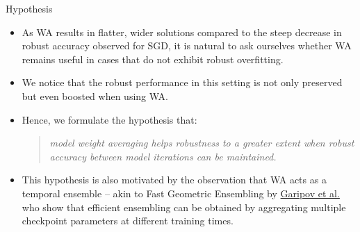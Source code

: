 \begin{frame}{Hypothesis}
    \begin{itemize}[<+-| alert@+>] %
        \item As WA results in flatter, wider solutions compared to the steep decrease in robust accuracy observed for SGD, it is natural to ask ourselves whether WA remains useful in cases that do not exhibit robust overfitting.
        \item We notice that the robust performance in this setting is not only preserved but even boosted when using WA. 
        \item Hence, we formulate the hypothesis that: 
            \begin{quote}
                \emph{model weight averaging helps robustness to a greater extent when robust accuracy between model iterations can be maintained.}
            \end{quote}
        \item This hypothesis is also motivated by the observation that WA acts as a temporal ensemble – akin to Fast Geometric Ensembling by \href{https://arxiv.org/pdf/1802.10026}{Garipov et al.} who show that efficient ensembling can be obtained by aggregating multiple checkpoint parameters at different training times.
    \end{itemize}
\end{frame}

